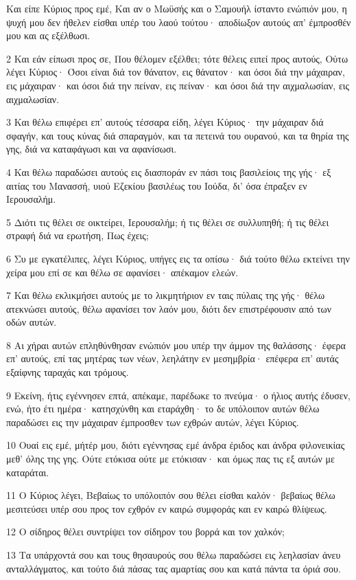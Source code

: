 \par Και είπε Κύριος προς εμέ, Και αν ο Μωϋσής και ο Σαμουήλ ίσταντο ενώπιόν μου, η ψυχή μου δεν ήθελεν είσθαι υπέρ του λαού τούτου· αποδίωξον αυτούς απ' έμπροσθέν μου και ας εξέλθωσι.
\par 2 Και εάν είπωσι προς σε, Που θέλομεν εξέλθει; τότε θέλεις ειπεί προς αυτούς, Ούτω λέγει Κύριος· Όσοι είναι διά τον θάνατον, εις θάνατον· και όσοι διά την μάχαιραν, εις μάχαιραν· και όσοι διά την πείναν, εις πείναν· και όσοι διά την αιχμαλωσίαν, εις αιχμαλωσίαν.
\par 3 Και θέλω επιφέρει επ' αυτούς τέσσαρα είδη, λέγει Κύριος· την μάχαιραν διά σφαγήν, και τους κύνας διά σπαραγμόν, και τα πετεινά του ουρανού, και τα θηρία της γης, διά να καταφάγωσι και να αφανίσωσι.
\par 4 Και θέλω παραδώσει αυτούς εις διασποράν εν πάσι τοις βασιλείοις της γής· εξ αιτίας του Μανασσή, υιού Εζεκίου βασιλέως του Ιούδα, δι' όσα έπραξεν εν Ιερουσαλήμ.
\par 5 Διότι τις θέλει σε οικτείρει, Ιερουσαλήμ; ή τις θέλει σε συλλυπηθή; ή τις θέλει στραφή διά να ερωτήση, Πως έχεις;
\par 6 Συ με εγκατέλιπες, λέγει Κύριος, υπήγες εις τα οπίσω· διά τούτο θέλω εκτείνει την χείρα μου επί σε και θέλω σε αφανίσει· απέκαμον ελεών.
\par 7 Και θέλω εκλικμήσει αυτούς με το λικμητήριον εν ταις πύλαις της γής· θέλω ατεκνώσει αυτούς, θέλω αφανίσει τον λαόν μου, διότι δεν επιστρέφουσιν από των οδών αυτών.
\par 8 Αι χήραι αυτών επληθύνθησαν ενώπιόν μου υπέρ την άμμον της θαλάσσης· έφερα επ' αυτούς, επί τας μητέρας των νέων, λεηλάτην εν μεσημβρία· επέφερα επ' αυτάς εξαίφνης ταραχάς και τρόμους.
\par 9 Εκείνη, ήτις εγέννησεν επτά, απέκαμε, παρέδωκε το πνεύμα· ο ήλιος αυτής έδυσεν, ενώ, ήτο έτι ημέρα· κατησχύνθη και εταράχθη· το δε υπόλοιπον αυτών θέλω παραδώσει εις την μάχαιραν έμπροσθεν των εχθρών αυτών, λέγει Κύριος.
\par 10 Ουαί εις εμέ, μήτέρ μου, διότι εγέννησας εμέ άνδρα έριδος και άνδρα φιλονεικίας μεθ' όλης της γης. Ούτε ετόκισα ούτε με ετόκισαν· και όμως πας τις εξ αυτών με καταράται.
\par 11 Ο Κύριος λέγει, Βεβαίως το υπόλοιπόν σου θέλει είσθαι καλόν· βεβαίως θέλω μεσιτεύσει υπέρ σου προς τον εχθρόν εν καιρώ συμφοράς και εν καιρώ θλίψεως.
\par 12 Ο σίδηρος θέλει συντρίψει τον σίδηρον του βορρά και τον χαλκόν;
\par 13 Τα υπάρχοντά σου και τους θησαυρούς σου θέλω παραδώσει εις λεηλασίαν άνευ ανταλλάγματος, και τούτο διά πάσας τας αμαρτίας σου και κατά πάντα τα όριά σου.
